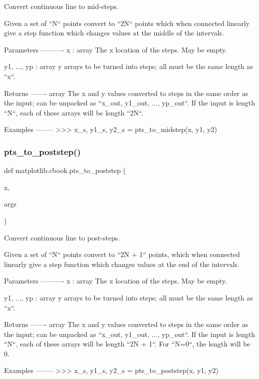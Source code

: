 \begin{DoxyVerb}Convert continuous line to mid-steps.

Given a set of ``N`` points convert to ``2N`` points which when connected
linearly give a step function which changes values at the middle of the
intervals.

Parameters
----------
x : array
    The x location of the steps. May be empty.

y1, ..., yp : array
    y arrays to be turned into steps; all must be the same length as
    ``x``.

Returns
-------
array
    The x and y values converted to steps in the same order as the input;
    can be unpacked as ``x_out, y1_out, ..., yp_out``.  If the input is
    length ``N``, each of these arrays will be length ``2N``.

Examples
--------
>>> x_s, y1_s, y2_s = pts_to_midstep(x, y1, y2)
\end{DoxyVerb}
 \mbox{\label{namespacematplotlib_1_1cbook_a72e84fb424d53d1657c70a6916a06ce4}} 
\subsubsection{\texorpdfstring{pts\+\_\+to\+\_\+poststep()}{pts\_to\_poststep()}}
{\footnotesize\ttfamily def matplotlib.\+cbook.\+pts\+\_\+to\+\_\+poststep (\begin{DoxyParamCaption}\item[{}]{x,  }\item[{}]{args }\end{DoxyParamCaption})}

\begin{DoxyVerb}Convert continuous line to post-steps.

Given a set of ``N`` points convert to ``2N + 1`` points, which when
connected linearly give a step function which changes values at the end of
the intervals.

Parameters
----------
x : array
    The x location of the steps. May be empty.

y1, ..., yp : array
    y arrays to be turned into steps; all must be the same length as ``x``.

Returns
-------
array
    The x and y values converted to steps in the same order as the input;
    can be unpacked as ``x_out, y1_out, ..., yp_out``.  If the input is
    length ``N``, each of these arrays will be length ``2N + 1``. For
    ``N=0``, the length will be 0.

Examples
--------
>>> x_s, y1_s, y2_s = pts_to_poststep(x, y1, y2)
\end{DoxyVerb}
 \mbox{\label{namespacematplotlib_1_1cbook_adb99f63714944cfeaad9052297db34d1}} 

